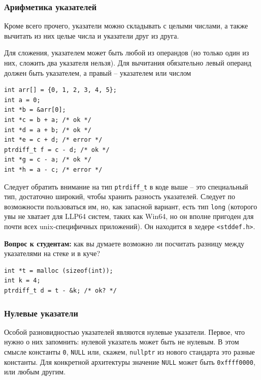 \documentclass[a4paper,12pt,oneside]{article}
\newif\ifanswers
\begin{document}
\subsubsection{Арифметика указателей}

Кроме всего прочего, указатели можно складывать с целыми числами, а также вычитать из них целые числа и указатели друг из друга.

Для сложения, указателем может быть любой из операндов (но только один из них, сложить два указателя нельзя). Для вычитания обязательно левый операнд должен быть указателем, а правый -- указателем или числом

\begin{lstlisting}
int arr[] = {0, 1, 2, 3, 4, 5};
int a = 0; 
int *b = &arr[0];
int *c = b + a; /* ok */
int *d = a + b; /* ok */
int *e = c + d; /* error */
ptrdiff_t f = c - d; /* ok */
int *g = c - a; /* ok */
int *h = a - c; /* error */
\end{lstlisting}

Следует обратить внимание на тип \lstinline!ptrdiff_t! в коде выше -- это специальный тип, достаточно широкий, чтобы хранить разность указателей. Следует по возможности пользоваться им, но, как запасной вариант, есть тип \lstinline!long! (которого увы не хватает для LLP64 систем, таких как Win64, но он вполне пригоден для почти всех unix-специфичных приложений). Он находится в хедере \lstinline!<stddef.h>!.

\textbf{Вопрос к студентам:} как вы думаете возможно ли посчитать разницу между указателями на стеке и в куче?

\begin{lstlisting}
int *t = malloc (sizeof(int));
int k = 4;
ptrdiff_t d = t - &k; /* ok? */
\end{lstlisting}

\ifanswers
Правильный ответ: разумеется да, адресная арифметика по стандарту прозрачна относительно того где расположена память до тех пор, пока все влезает в \lstinline!ptrdiff_t!.
\fi

\subsubsection{Нулевые указатели}\label{NullPointers}

Особой разновидностью указателей являются нулевые указатели. Первое, что нужно о них запомнить: нулевой указатель может быть не нулевым. В этом смысле константы \lstinline!0!, \lstinline!NULL! или, скажем, \lstinline!nullptr! из нового стандарта это разные константы. Для конкретной архитектуры значение \lstinline!NULL! может быть \lstinline!0xffff0000!, или любым другим.
\end{document}
